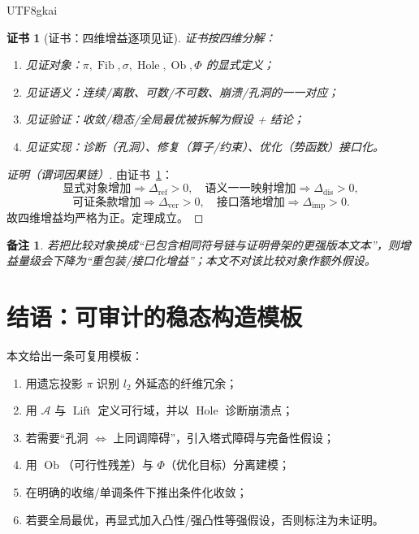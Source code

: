 \documentclass[12pt]{article}
\newtheorem{remark}{备注}[section]
\newtheorem{Certificate}{证书}[section]
\newcommand{\Ob}{\operatorname{Ob}}
\newcommand{\Hole}{\operatorname{Hole}}
\newcommand{\Lift}{\operatorname{Lift}}
\begin{document}
\begin{CJK*}{UTF8}{gkai}
\begin{Certificate}[证书：四维增益逐项见证]\label{cert:gain-positive}
证书按四维分解：
\begin{enumerate}
\item 见证对象：$\pi,\operatorname{Fib},\sigma,\Hole,\Ob,\Phi$ 的显式定义；
\item 见证语义：连续/离散、可数/不可数、崩溃/孔洞的一一对应；
\item 见证验证：收敛/稳态/全局最优被拆解为假设 + 结论；
\item 见证实现：诊断（孔洞）、修复（算子/约束）、优化（势函数）接口化。
\end{enumerate}
\end{Certificate}

\begin{proof}[证明（谓词因果链）]
由证书~\ref{cert:gain-positive}：
\[
\text{显式对象增加}
\Rightarrow
\Delta_{\mathrm{ref}}>0,
\quad
\text{语义一一映射增加}
\Rightarrow
\Delta_{\mathrm{dis}}>0,
\]
\[
\text{可证条款增加}
\Rightarrow
\Delta_{\mathrm{ver}}>0,
\quad
\text{接口落地增加}
\Rightarrow
\Delta_{\mathrm{imp}}>0.
\]
故四维增益均严格为正。定理成立。
\end{proof}

\begin{remark}
若把比较对象换成“已包含相同符号链与证明骨架的更强版本文本”，则增益量级会下降为“重包装/接口化增益”；本文不对该比较对象作额外假设。
\end{remark}

\section{结语：可审计的稳态构造模板}

本文给出一条可复用模板：

\begin{enumerate}
\item 用遗忘投影 $\pi$ 识别 $l_2$ 外延态的纤维冗余；
\item 用 $\mathcal A$ 与 $\Lift$ 定义可行域，并以 $\Hole$ 诊断崩溃点；
\item 若需要“孔洞 $\Leftrightarrow$ 上同调障碍”，引入塔式障碍与完备性假设；
\item 用 $\Ob$（可行性残差）与 $\Phi$（优化目标）分离建模；
\item 在明确的收缩/单调条件下推出条件化收敛；
\item 若要全局最优，再显式加入凸性/强凸性等强假设，否则标注为未证明。
\end{enumerate}


\end{CJK*}
\end{document}
